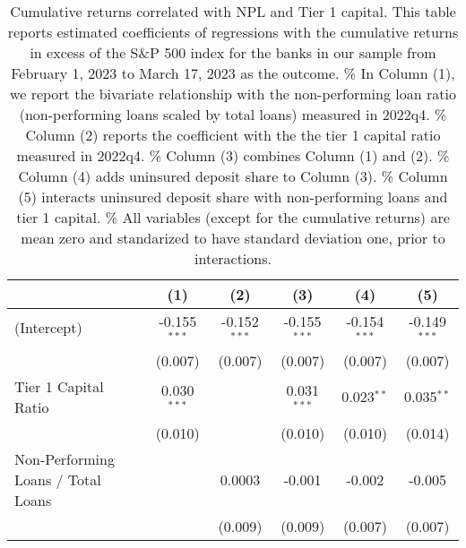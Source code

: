 
\begin{table}[htbp]
   \caption{\label{tab:npl_capital} Cumulative returns correlated with NPL and Tier 1 capital. This table reports estimated coefficients of regressions with the cumulative returns in excess of the S\&P 500 index for the banks in our sample from February 1, 2023 to March 17, 2023 as the outcome. \%
      In Column (1), we report the bivariate relationship with the non-performing loan ratio (non-performing loans scaled by total loans) measured in 2022q4. \%
      Column (2) reports the coefficient with the the tier 1 capital ratio measured in 2022q4. \%
      Column (3) combines Column (1) and (2). \%
       Column (4) adds uninsured deposit share to Column (3). \%
       Column (5) interacts uninsured deposit share with non-performing loans and tier 1 capital. \%
       All variables (except for the cumulative returns) are mean zero and standarized to have standard deviation one, prior to interactions.}
   \bigskip
   \centering
   \begin{adjustbox}{width = 1.2\textwidth, center}
      \begin{tabular}{lccccc}
         \toprule
                                                                              & (1)            & (2)                   & (3)            & (4)            & (5)\\  
         \midrule 
         (Intercept)                                                          & -0.155$^{***}$ & -0.152$^{***}$        & -0.155$^{***}$ & -0.154$^{***}$ & -0.149$^{***}$\\   
                                                                              & (0.007)        & (0.007)               & (0.007)        & (0.007)        & (0.007)\\   
         Tier 1 Capital Ratio                                                 & 0.030$^{***}$  &                       & 0.031$^{***}$  & 0.023$^{**}$   & 0.035$^{**}$\\   
                                                                              & (0.010)        &                       & (0.010)        & (0.010)        & (0.014)\\   
         Non-Performing Loans / Total Loans                                   &                & 0.0003                & -0.001         & -0.002         & -0.005\\   
                                                                              &                & (0.009)               & (0.009)        & (0.007)        & (0.007)\\   

\end{tabular}
\end{adjustbox}
\end{table}
